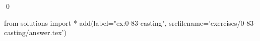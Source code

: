 
\begin{ex}
  \label{ex:0-83-casting}
  
  \qed
\end{ex}
\begin{python0}
from solutions import *
add(label="ex:0-83-casting",
    srcfilename='exercises/0-83-casting/answer.tex')
\end{python0}
